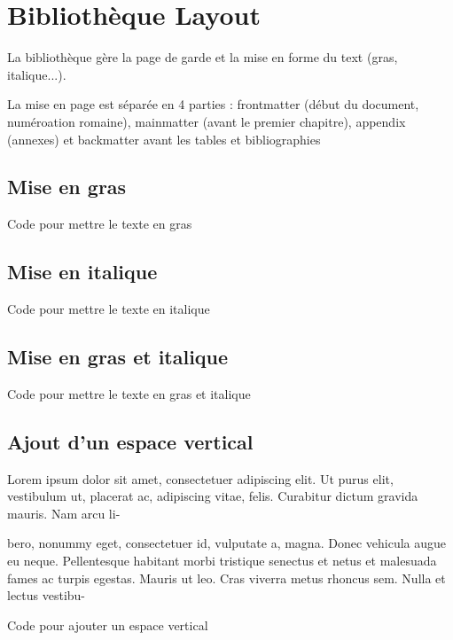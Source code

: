\chapter{Bibliothèque Layout}

La bibliothèque  gère la page de garde et la mise en forme du text (gras, italique...).

La mise en page est séparée en 4 parties : frontmatter (début du document, numéroation romaine), mainmatter (avant le premier chapitre), appendix (annexes) et backmatter avant les tables et bibliographies

\section{Mise en gras}

\sn

\begin{Latex}{Code pour mettre le texte en gras}
\end{Latex}

\section{Mise en italique}

\sn
{}
\begin{Latex}{Code pour mettre le texte en italique}
\end{Latex}

\section{Mise en gras et italique}

\sn

\begin{Latex}{Code pour mettre le texte en gras et italique}
\end{Latex}


\section{Ajout d'un espace vertical}

Lorem ipsum dolor sit amet, consectetuer adipiscing elit. Ut purus elit, vestibulum
ut, placerat ac, adipiscing vitae, felis. Curabitur dictum gravida mauris. Nam arcu li- \sn

bero, nonummy eget, consectetuer id, vulputate a, magna. Donec vehicula augue eu
neque. Pellentesque habitant morbi tristique senectus et netus et malesuada fames ac
turpis egestas. Mauris ut leo. Cras viverra metus rhoncus sem. Nulla et lectus vestibu-

\begin{Latex}{Code pour ajouter un espace vertical}
\sn
\end{Latex}

